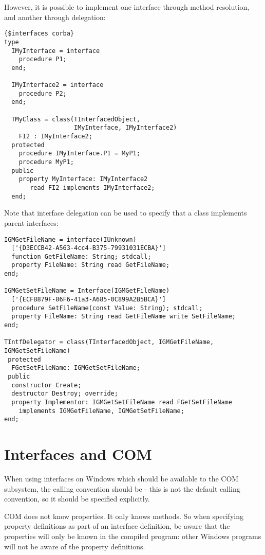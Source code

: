 However, it is possible to implement one interface through method
resolution, and another through delegation:
\begin{verbatim}
{$interfaces corba}
type
  IMyInterface = interface
    procedure P1;
  end;

  IMyInterface2 = interface
    procedure P2;
  end;

  TMyClass = class(TInterfacedObject, 
                   IMyInterface, IMyInterface2)
    FI2 : IMyInterface2;
  protected
    procedure IMyInterface.P1 = MyP1;
    procedure MyP1;
  public 
    property MyInterface: IMyInterface2
       read FI2 implements IMyInterface2;
  end;
\end{verbatim}

Note that interface delegation can be used to specify that a class
implements parent interfaces:
\begin{verbatim}
IGMGetFileName = interface(IUnknown)
  ['{D3ECCB42-A563-4cc4-B375-79931031ECBA}']
  function GetFileName: String; stdcall;
  property FileName: String read GetFileName;
end;

IGMGetSetFileName = Interface(IGMGetFileName)
  ['{ECFB879F-86F6-41a3-A685-0C899A2B5BCA}']
  procedure SetFileName(const Value: String); stdcall;
  property FileName: String read GetFileName write SetFileName;
end;

TIntfDelegator = class(TInterfacedObject, IGMGetFileName, IGMGetSetFileName)
 protected
  FGetSetFileName: IGMGetSetFileName;
 public
  constructor Create;
  destructor Destroy; override;
  property Implementor: IGMGetSetFileName read FGetSetFileName 
    implements IGMGetFileName, IGMGetSetFileName;
end;
\end{verbatim}

\section{Interfaces and COM}
When using interfaces on Windows which should be available to the COM
subsystem, the calling convention should be  - this is not the
default \fpc calling convention, so it should be specified explicitly.

COM does not know properties. It only knows methods. So when specifying
property definitions as part of an interface definition, be aware that the
properties will only be known in the \fpc compiled program: other Windows
programs will not be aware of the property definitions. 

